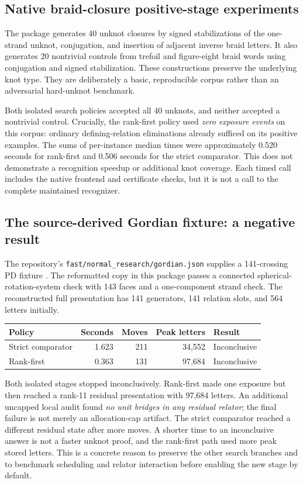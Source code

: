 \documentclass[11pt,letterpaper]{article}
\theoremstyle{definition}\newtheorem{definition}[theorem]{Definition}
\begin{document}
\subsection{Native braid-closure positive-stage experiments}
The package generates 40 unknot closures by signed stabilizations of the one-strand unknot, conjugation, and insertion of adjacent inverse braid letters. It also generates 20 nontrivial controls from trefoil and figure-eight braid words using conjugation and signed stabilization. These constructions preserve the underlying knot type. They are deliberately a basic, reproducible corpus rather than an adversarial hard-unknot benchmark.

Both isolated search policies accepted all 40 unknots, and neither accepted a nontrivial control. Crucially, the rank-first policy used \emph{zero exposure events} on this corpus: ordinary defining-relation eliminations already sufficed on its positive examples. The sums of per-instance median times were approximately 0.520 seconds for rank-first and 0.506 seconds for the strict comparator. This does not demonstrate a recognition speedup or additional knot coverage. Each timed call includes the native frontend and certificate checks, but it is not a call to the complete maintained recognizer.

\subsection{The source-derived Gordian fixture: a negative result}
The repository's \texttt{fast/normal\_research/gordian.json} supplies a 141-crossing PD fixture \cite{repo}. The reformatted copy in this package passes a connected spherical-rotation-system check with 143 faces and a one-component strand check. The reconstructed full presentation has 141 generators, 141 relation slots, and 564 letters initially.

\begin{center}
\begin{tabular}{lrrrl}
\toprule Policy & Seconds & Moves & Peak letters & Result\\\midrule
Strict comparator & 1.623 & 211 & 34,552 & Inconclusive\\
Rank-first & 0.363 & 131 & 97,684 & Inconclusive\\
\bottomrule
\end{tabular}
\end{center}

Both isolated stages stopped inconclusively. Rank-first made one exposure but then reached a rank-11 residual presentation with 97,684 letters. An additional uncapped local audit found \emph{no unit bridges in any residual relator}; the final failure is not merely an allocation-cap artifact. The strict comparator reached a different residual state after more moves. A shorter time to an inconclusive answer is not a faster unknot proof, and the rank-first path used more peak stored letters. This is a concrete reason to preserve the other search branches and to benchmark scheduling and relator interaction before enabling the new stage by default.
\end{document}
